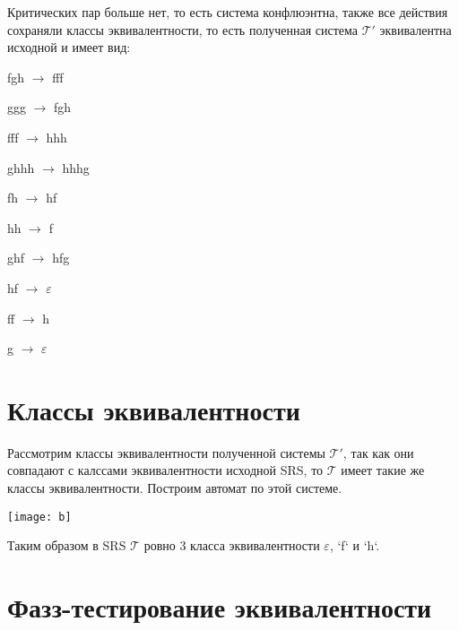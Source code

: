 \documentclass[a4paper, 14pt]{extarticle}
\begin{document}
Критических пар больше нет, то есть система конфлюэнтна, также все действия сохраняли классы эквивалентности, то есть полученная система $\mathcal{T}'$ эквивалентна исходной и имеет вид:

fgh $\rightarrow$ fff

ggg $\rightarrow$ fgh

fff $\rightarrow$ hhh

ghhh $\rightarrow$ hhhg

fh $\rightarrow$ hf

hh $\rightarrow$ f

ghf $\rightarrow$ hfg

hf $\rightarrow$ $\varepsilon$

ff $\rightarrow$ h

g $\rightarrow$ $\varepsilon$

\section{Классы эквивалентности}

Рассмотрим классы эквивалентности полученной системы $\mathcal{T}'$, так как они совпадают с калссами эквивалентности исходной SRS, то $\mathcal{T}$ имеет такие же классы эквивалентности. Построим автомат по этой системе.

\begin{center}
\texttt{[image: b]}
\end{center}

Таким образом в SRS $\mathcal{T}$ ровно 3 класса эквивалентности $\varepsilon$, `f` и `h`.

\section{Фазз-тестирование эквивалентности}
\end{document}
